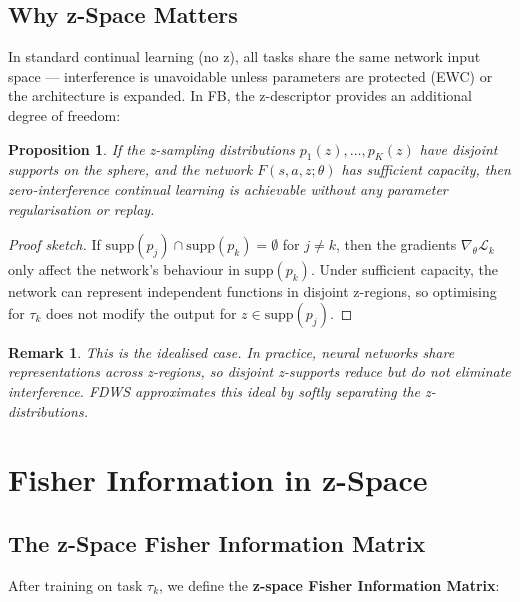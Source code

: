 \documentclass[11pt]{article}
\newcommand{\loss}{\mathcal{L}}
\newtheorem{proposition}{Proposition}
\newtheorem{remark}{Remark}
\begin{document}
\subsection{Why z-Space Matters}

In standard continual learning (no z), all tasks share the same network input space — interference is unavoidable unless parameters are protected (EWC) or the architecture is expanded. In FB, the z-descriptor provides an additional degree of freedom:

\begin{proposition}
If the z-sampling distributions $p_1(z), \ldots, p_K(z)$ have disjoint supports on the sphere, and the network $F(s, a, z; \theta)$ has sufficient capacity, then zero-interference continual learning is achievable without any parameter regularisation or replay.
\end{proposition}

\begin{proof}[Proof sketch]
If $\text{supp}(p_j) \cap \text{supp}(p_k) = \emptyset$ for $j \neq k$, then the gradients $\nabla_\theta \loss_k$ only affect the network's behaviour in $\text{supp}(p_k)$. Under sufficient capacity, the network can represent independent functions in disjoint z-regions, so optimising for $\tau_k$ does not modify the output for $z \in \text{supp}(p_j)$.
\end{proof}

\begin{remark}
This is the idealised case. In practice, neural networks share representations across z-regions, so disjoint z-supports reduce but do not eliminate interference. FDWS approximates this ideal by \emph{softly} separating the z-distributions.
\end{remark}

\section{Fisher Information in z-Space}

\subsection{The z-Space Fisher Information Matrix}

After training on task $\tau_k$, we define the \textbf{z-space Fisher Information Matrix}:
\end{document}
